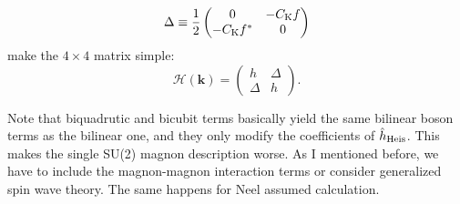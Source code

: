 \documentclass[11pt, aps, longbibliography]{article}
\begin{document}
\begin{tcolorbox}
\begin{equation}
        \Delta \equiv \frac{1}{2}\begin{pmatrix} 0 & -C_{\rm K}f \\ -C_{\rm K}f^* & 0 \end{pmatrix}
    \end{equation}
    make the $4\times4$ matrix simple:
    \begin{equation}
        \mathcal{H}(\bm{k}) = \begin{pmatrix} h & \Delta \\ \Delta & h \end{pmatrix}.
    \end{equation}
\end{tcolorbox}

Note that biquadrutic and bicubit terms basically yield the same bilinear boson terms as the bilinear one,
and they only modify the coefficients of $\hat{h}_{\rm Heis}$. This makes the single SU(2) magnon description worse.
As I mentioned before, we have to include the magnon-magnon interaction terms or consider generalized spin wave theory.
The same happens for Neel assumed calculation.
\end{document}
